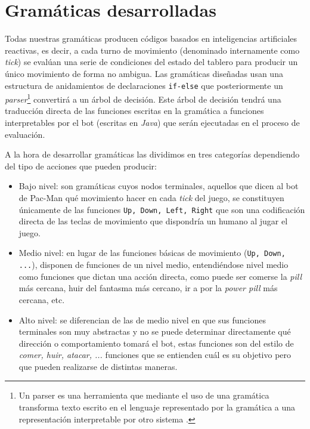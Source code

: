 \section{Gramáticas desarrolladas}
Todas nuestras gramáticas producen códigos basados en inteligencias artificiales reactivas, es decir, a cada turno de movimiento (denominado internamente como \textit{tick}) se evalúan una serie de condiciones del estado del tablero para producir un único movimiento de forma no ambigua. Las gramáticas diseñadas usan una estructura de anidamientos de declaraciones \texttt{if-else} que posteriormente un \textit{parser}\footnote{Un parser es una herramienta que mediante el uso de una gramática transforma texto escrito en el lenguaje representado por la gramática a una representación interpretable por otro sistema \cite{parserTechopedia}.
} convertirá a un árbol de decisión. Este árbol de decisión tendrá una traducción directa de las funciones escritas en la gramática a funciones interpretables por el bot (escritas en \textit{Java}) que serán ejecutadas en el proceso de evaluación.
 
A la hora de desarrollar gramáticas las dividimos en tres categorías dependiendo del tipo de acciones que pueden producir:
\begin{itemize}
\item Bajo nivel: son gramáticas cuyos nodos terminales, aquellos que dicen al bot de Pac-Man qué movimiento hacer en cada \textit{tick} del juego, se constituyen únicamente de las funciones \texttt{Up, Down, Left, Right} que son una codificación directa de las teclas de movimiento que dispondría un humano al jugar el juego.

\item Medio nivel: en lugar de las funciones básicas de movimiento (\texttt{Up, Down, ...}), disponen de funciones de un nivel medio,  entendiéndose nivel medio como funciones que dictan una acción directa, como puede ser comerse la \textit{pill} más cercana, huir del fantasma más cercano, ir a por la \textit{power pill} más cercana, etc.

\item Alto nivel: se diferencian de las de medio nivel en que sus funciones terminales son muy abstractas y no se puede determinar directamente qué dirección o comportamiento tomará el bot, estas funciones son del estilo de \textit{comer, huir, atacar, ...} funciones que se entienden cuál es su objetivo pero que pueden realizarse de distintas maneras.
\end{itemize}

